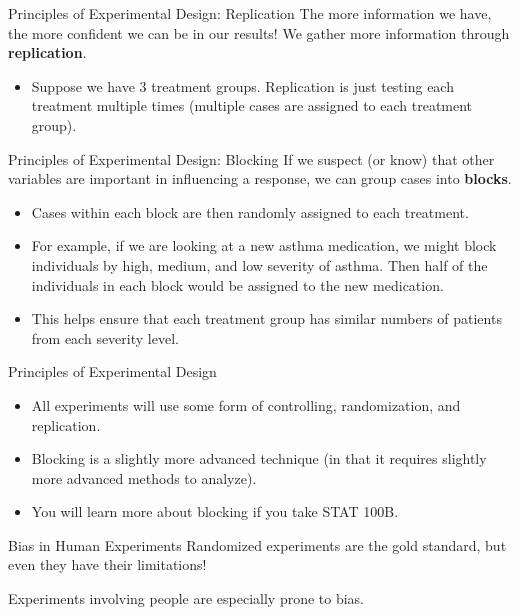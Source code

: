\begin{frame}{Principles of Experimental Design: Replication}
    The more information we have, the more confident we can be in our results! We gather more information through \textbf{replication}. 
    \begin{itemize}
        \item Suppose we have 3 treatment groups. Replication is just testing each treatment multiple times (multiple cases are assigned to each treatment group). 
    \end{itemize}
\end{frame}

\begin{frame}{Principles of Experimental Design: Blocking}
    If we suspect (or know) that other variables are important in influencing a response, we can group cases into \textbf{blocks}.
    \begin{itemize}
        \item Cases within each block are then randomly assigned to each treatment. 
        \item For example, if we are looking at a new asthma medication, we might block individuals by high, medium, and low severity of asthma. Then half of the individuals in each block would be assigned to the new medication. 
        \item This helps ensure that each treatment group has similar numbers of patients from each severity level. 
    \end{itemize}
\end{frame}

\begin{frame}{Principles of Experimental Design}
    \begin{itemize}
        \item All experiments will use some form of controlling, randomization, and replication. 
        \item Blocking is a slightly more advanced technique (in that it requires slightly more advanced methods to analyze). 
        \item You will learn more about blocking if you take STAT 100B. 
    \end{itemize}
\end{frame}

\begin{frame}{Bias in Human Experiments}
    Randomized experiments are the gold standard, but even they have their limitations!
    
    \vspace{12pt}
    Experiments involving people are especially prone to bias.
\end{frame}

